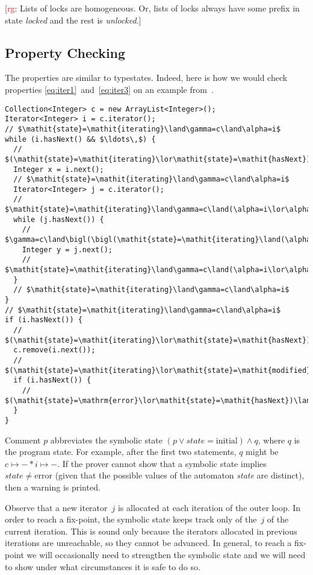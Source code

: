 \documentclass[a4paper]{article}
\newcommand{\todo}[2]{{\small [\textcolor{red}{#1}: #2]}}
\newcommand{\rg}[1]{\todo{rg}{#1}}
\theoremstyle{remark}
\begin{document}
\rg{Lists of locks are homogeneous. Or, lists of locks always have
some prefix in state \textit{locked} and the rest is \textit{unlocked}.}

\subsection{Property Checking}\label{sec:property_checking} %

The properties are similar to typestates.
Indeed, here is how we would check properties \eqref{eq:iter1}~and~\eqref{eq:iter3} on an example from~\cite{bierhoff2007}.
\begin{lstlisting}
Collection<Integer> c = new ArrayList<Integer>();
Iterator<Integer> i = c.iterator();
// $\mathit{state}=\mathit{iterating}\land\gamma=c\land\alpha=i$
while (i.hasNext() && $\ldots\,$) {
  // $(\mathit{state}=\mathit{iterating}\lor\mathit{state}=\mathit{hasNext})\land\gamma=c\land\alpha=i$
  Integer x = i.next();
  // $\mathit{state}=\mathit{iterating}\land\gamma=c\land\alpha=i$
  Iterator<Integer> j = c.iterator();
  // $\mathit{state}=\mathit{iterating}\land\gamma=c\land(\alpha=i\lor\alpha=j)$
  while (j.hasNext()) {
    // $\gamma=c\land\bigl(\bigl(\mathit{state}=\mathit{iterating}\land(\alpha=i\lor\alpha=j)\bigr)\lor\bigl(\mathit{state}=\mathit{hasNext}\land\alpha=j\bigr)\bigr)$
    Integer y = j.next();
    // $\mathit{state}=\mathit{iterating}\land\gamma=c\land(\alpha=i\lor\alpha=j)$
  }
  // $\mathit{state}=\mathit{iterating}\land\gamma=c\land\alpha=i$
}
// $\mathit{state}=\mathit{iterating}\land\gamma=c\land\alpha=i$
if (i.hasNext()) {
  // $(\mathit{state}=\mathit{iterating}\lor\mathit{state}=\mathit{hasNext})\land\gamma=c\land\alpha=i$
  c.remove(i.next());
  // $(\mathit{state}=\mathit{iterating}\lor\mathit{state}=\mathit{modified})\land\alpha=i$
  if (i.hasNext()) {
    // $(\mathit{state}=\mathrm{error}\lor\mathit{state}=\mathit{hasNext})\land\alpha=i$
  }
}
\end{lstlisting}
Comment $p$ abbreviates the symbolic state $(p\lor\mathit{state}=\mathrm{initial})\land q$, where $q$ is the program state.
For example, after the first two statements, $q$ might be $c\mapsto-*i\mapsto-$.
If the prover cannot show that a symbolic state implies $\mathit{state}\ne\mathrm{error}$ (given that the possible values of the automaton \textit{state} are distinct), then a warning is printed.

Observe that a new iterator~$j$ is allocated at each iteration of the outer loop.
In order to reach a fix-point, the symbolic state keeps track only of the~$j$ of the current iteration.
This is sound only because the iterators allocated in previous iterations are unreachable, so they cannot be advanced.
In general, to reach a fix-point we will occasionally need to strengthen the symbolic state and we will need to show under what circumstances it is safe to do so.
\end{document}

